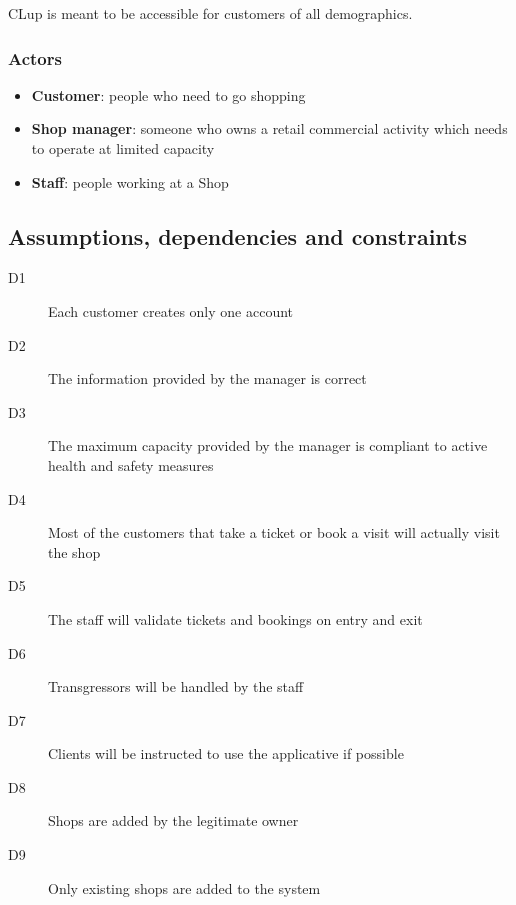 CLup is meant to be accessible for customers of all demographics.

\subsubsection{Actors}
\begin{itemize}
    \item \textbf{Customer}: people who need to go shopping
    \item \textbf{Shop manager}: someone who owns a retail commercial activity which needs to operate at limited capacity
    \item \textbf{Staff}: people working at a Shop
\end{itemize}

\subsection{Assumptions, dependencies and constraints}
\begin{description}
    \item[D1] Each customer creates only one account
    \item[D2] The information provided by the manager is correct
    \item[D3] The maximum capacity provided by the manager is compliant to active health and safety measures
    \item[D4] Most of the customers that take a ticket or book a visit will actually visit the shop
    \item[D5] The staff will validate tickets and bookings on entry and exit
    \item[D6] Transgressors will be handled by the staff
    \item[D7] Clients will be instructed to use the applicative if possible
    \item[D8] Shops are added by the legitimate owner
    \item[D9] Only existing shops are added to the system
\end{description}